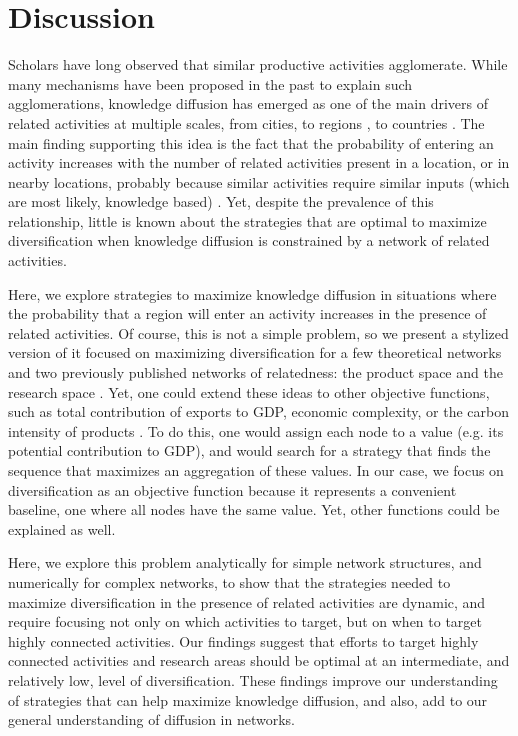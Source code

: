 \documentclass[preprint,superscriptaddress,floatfix]{article}
\begin{document}
\section*{\label{sec:Discussion}Discussion}
Scholars have long observed that similar productive activities agglomerate\cite{marshall2009principles}. While many mechanisms have been proposed in the past to explain such agglomerations, knowledge diffusion has emerged as one of the main drivers of related activities at multiple scales, from cities, to regions \cite{neffke2011regions}, to countries \cite{hidalgo2007product}. The main finding supporting this idea is the fact that the probability of entering an activity increases with the number of related activities present in a location, or in nearby locations, probably because similar activities require similar inputs (which are most likely, knowledge based)  \cite{hidalgo2007product,hausmann2014atlas,neffke2011regions,zhu2017jump,petralia2017climbing,boschma2015relatedness,bahar2014neighbors,guevara2016research,fink2017serendipity,romer1994origins,hausmann2011network,weitzman1998recombinant}. Yet, despite the prevalence of this relationship, little is known about the strategies that are optimal to maximize diversification when knowledge diffusion is constrained by a network of related activities. 

Here, we explore strategies to maximize knowledge diffusion in situations where the probability that a region will enter an activity increases in the presence of related activities. Of course, this is not a simple problem, so we present a stylized version of it focused on maximizing diversification for a few theoretical networks and two previously published networks of relatedness: the product space \cite{hidalgo2007product} and the research space \cite{guevara2016research}. Yet, one could extend these ideas to other objective functions, such as total contribution of exports to GDP, economic complexity\cite{hidalgo2009building}, or the carbon intensity of products \cite{hamwey2013mapping}. To do this, one would assign each node to a value (e.g. its potential contribution to GDP), and would search for a strategy that finds the sequence that maximizes an aggregation of these values. In our case, we focus on diversification as an objective function because it represents a convenient baseline, one where all nodes have the same value. Yet, other functions could be explained as well. 

Here, we explore this problem analytically for simple network structures, and numerically for complex networks, to show that the strategies needed to maximize diversification in the presence of related activities are dynamic, and require focusing not only on which activities to target, but on when to target highly connected activities. Our findings suggest that efforts to target highly connected activities and research areas should be optimal at an intermediate, and relatively low, level of diversification. These findings improve our understanding of strategies that can help maximize knowledge diffusion, and also, add to our general understanding of diffusion in networks.
\end{document}
